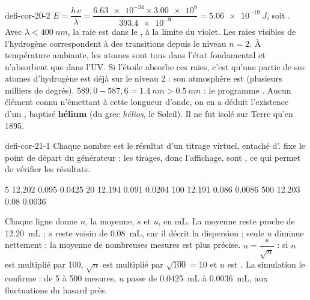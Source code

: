 \begin{blocEdition}{defi-cor-20-2}
$E=\dfrac{h\,c}{\lambda}=\dfrac{\num{6,63e-34}\times\num{3,00e8}}{\num{393,4e-9}}=\qty{5,06e-19}{J}$, soit . Avec $\lambda<\qty{400}{nm}$, la raie est dans le
, à la limite du violet.
Les raies visibles de l'hydrogène correspondent à des transitions depuis le niveau $n=2$. À température ambiante, les atomes sont
tous dans l'état fondamental et n'absorbent que dans l'UV. Si l'étoile absorbe ces raies, c'est qu'une partie de ses atomes
d'hydrogène est déjà sur le niveau 2 : son atmosphère est  (plusieurs milliers de degrés).
$589{,}0-587{,}6=\qty{1,4}{nm}>\qty{0,5}{nm}$ : le programme . Aucun élément connu n'émettant à cette longueur
d'onde, on en a déduit l'existence d'un , baptisé \textbf{hélium} (du grec \emph{hélios}, le Soleil). Il ne fut isolé sur
Terre qu'en 1895.
\end{blocEdition}

\begin{blocEdition}{defi-cor-21-1}
Chaque nombre est le résultat d'un titrage virtuel, entaché d'.  fixe le point de
départ du générateur : les tirages, donc l'affichage, sont , ce qui permet de vérifier les résultats.
\begin{console}
5 12.202 0.095 0.0425
20 12.194 0.091 0.0204
100 12.191 0.086 0.0086
500 12.203 0.08 0.0036
\end{console}
Chaque ligne donne $n$, la moyenne, $s$ et $u$, en mL. La moyenne reste proche de \qty{12,20}{mL} ; $s$ reste voisin de \qty{0,08}{mL}, car il décrit
la dispersion  ; seule $u$ diminue nettement : la moyenne de nombreuses mesures est plus précise.
$u=\dfrac{s}{\sqrt{n}}$ : si $n$ est multiplié par 100, $\sqrt{n}$ est multiplié par $\sqrt{100}=10$ et $u$ est . La simulation le confirme :
de 5 à 500 mesures, $u$ passe de \qty{0,0425}{mL} à \qty{0,0036}{mL}, aux fluctuations du hasard près.
\label{figedition-defi-cor-21-1-1}
\end{blocEdition}

